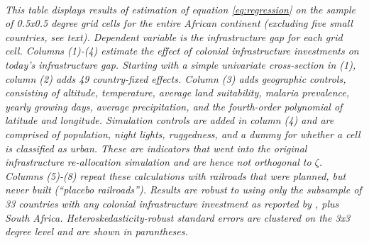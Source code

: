 \documentclass[11pt, oneside]{article}   	%
\begin{document}
\begin{table}[]
\justify
\textit{\\ \footnotesize This table displays results of estimation of equation \ref{eq:regression} on the sample of 0.5x0.5 degree grid cells for the entire African continent (excluding five small countries, see text). Dependent variable is the infrastructure gap for each grid cell. Columns (1)-(4) estimate the effect of colonial infrastructure investments on today's infrastructure gap. Starting with a simple univariate cross-section in (1), column (2) adds 49 country-fixed effects. Column (3) adds geographic controls, consisting of altitude, temperature, average land suitability, malaria prevalence, yearly growing days, average precipitation, and the fourth-order polynomial of latitude and longitude. Simulation controls are added in column (4) and are comprised of population, night lights, ruggedness, and a dummy for whether a cell is classified as urban. These are indicators that went into the original infrastructure re-allocation simulation and are hence not orthogonal to $\zeta$. Columns (5)-(8) repeat these calculations with railroads that were planned, but never built (``placebo railroads''). Results are robust to using only the subsample of 33 countries with any colonial infrastructure investment as reported by \cite{jedwab_permanent_2016}, plus South Africa. Heteroskedasticity-robust standard errors are clustered on the 3x3 degree level and are shown in parantheses.}
\end{table}
\end{document}
